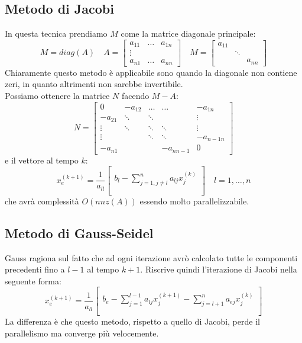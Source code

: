 \subsection{Metodo di Jacobi}
In questa tecnica prendiamo $M$ come la matrice diagonale principale:
\begin{equation*}
	M=diag(A) \quad A=\begin{bmatrix}
		a_{11} & \ldots & a_{1n} \\
		\vdots & & \\
		a_{n1} & \ldots & a_{nn}
	\end{bmatrix} \quad
	M = \begin{bmatrix}
		a_{11} \\
		& \ddots \\
		& & a_{nn}
	\end{bmatrix}
\end{equation*}
Chiaramente questo metodo è applicabile sono quando la diagonale non contiene zeri, in quanto altrimenti non sarebbe invertibile.\\
Possiamo ottenere la matrice $N$ facendo $M-A$:
\begin{equation*}
	N=\begin{bmatrix}
		0 & -a_{12} & \ldots & \ldots & -a_{1n} \\
		-a_{21} & \ddots & \ddots && \vdots \\
		\vdots & \ddots & \ddots & \ddots & \vdots \\
		\vdots & & \ddots & \ddots & -a_{n-1 n}\\
		-a_{n1} & & &-a_{n n-1} & 0 
	\end{bmatrix}
\end{equation*}
e il vettore al tempo $k$:
\begin{equation}
	x_e^{(k+1)} = \frac{1}{a_{ll}} \begin{bmatrix}\\
		b_l - \sum_{j=1, j\neq l}^n a_{lj}x_j^{(k)}\\
		\\
	\end{bmatrix} \quad l=1, \ldots, n
\end{equation}
che avrà complessità $O(nnz(A))$ essendo molto parallelizzabile.

\subsection{Metodo di Gauss-Seidel}
Gauss ragiona sul fatto che ad ogni iterazione avrò calcolato tutte le componenti precedenti fino a $l-1$ al tempo $k+1$. Riscrive quindi l'iterazione di Jacobi nella seguente forma:
\begin{equation}
	x_e^{(k+1)} = \frac{1}{a_{ll}} \begin{bmatrix}\\
		b_e-\sum_{j=1}^{l-1}a_{lj}x_j^{(k+1)}-\sum_{j=l+1}^{n}a_{ej}x_j^{(k)}\\\\
	\end{bmatrix}
\end{equation}
La differenza è che questo metodo, rispetto a quello di Jacobi, perde il parallelismo ma converge più velocemente.

